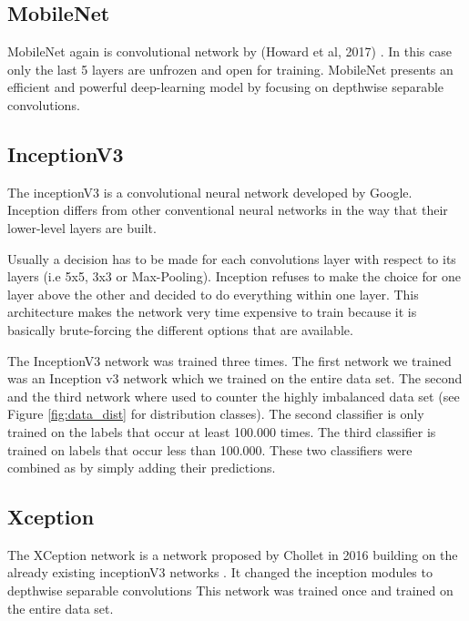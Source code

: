 \documentclass[10pt, a4paper]{article}
\begin{document}
\begin{multicols}{2}
		\subsection{MobileNet}
		MobileNet again is convolutional network by (Howard et al, 2017) \cite{howard2017mobilenets}. In this case only the last 5 layers are unfrozen and open for training. MobileNet presents an efficient and powerful deep-learning model by focusing on depthwise separable convolutions. 
		
		\subsection{InceptionV3}
		The inceptionV3 \cite{DBLP:journals/corr/SzegedyVISW15} is a convolutional neural network developed by Google. Inception differs from other conventional neural networks in the way that their lower-level layers are built.
		
		Usually a decision has to be made for each convolutions layer with respect to its layers (i.e 5x5, 3x3 or Max-Pooling). Inception refuses to make the choice for one layer above the other and decided to do everything within one layer. This architecture makes the network very time expensive to train because it is basically brute-forcing the different options that are available.
		
		The InceptionV3 network was trained three times. The first network we trained was an Inception v3 network which we trained on the entire data set. The second and the third network where used to counter the highly imbalanced data set (see Figure \ref{fig:data_dist} for distribution classes). The second classifier is only trained on the labels that occur at least 100.000 times. The third classifier is trained on labels that occur less than 100.000. These two classifiers were combined as by simply adding their predictions. 

		\subsection{Xception}
		The XCeption network is a network proposed by Chollet in 2016 building on the already existing inceptionV3 networks \cite{chollet2016xception}. 
		It changed the inception modules to depthwise separable convolutions 
		This network was trained once and trained on the entire data set.
		

\end{multicols}
\end{document}
